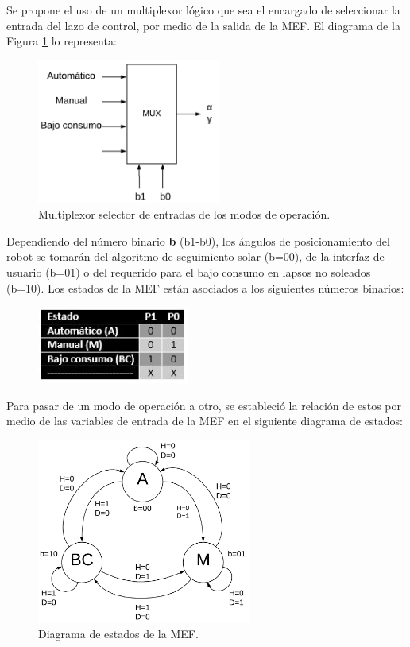 Se propone el uso de un multiplexor lógico que sea el encargado de seleccionar la entrada del lazo de control, por medio de la salida de la MEF. El diagrama de la Figura \ref{fig:mef_mux} lo representa:
\begin{figure}[H]
	\centering
	\includegraphics[width=6cm]{imagenes/MEF_Miley(mux)}
	\caption{Multiplexor selector de entradas de los modos de operación.}
	\label{fig:mef_mux}
\end{figure}
Dependiendo del número binario \textbf{b} (b1-b0), los ángulos de posicionamiento del robot se tomarán del algoritmo de seguimiento solar (b=00), de la interfaz de usuario (b=01) o del requerido para el bajo consumo en lapsos no soleados (b=10). Los estados de la MEF están asociados a los siguientes números binarios:
\begin{figure}[H]
	\centering
	\includegraphics[width=5cm]{imagenes/MEF_estados}
\end{figure}
Para pasar de un modo de operación a otro, se estableció la relación de estos por medio de las variables de entrada de la MEF en el siguiente diagrama de estados:

\begin{figure}[H]
	\centering
	\includegraphics[width=7cm]{imagenes/MEF_Miley(diagrama)}
	\caption{Diagrama de estados de la MEF.}
	\label{fig:mef_diagrama}
\end{figure}

